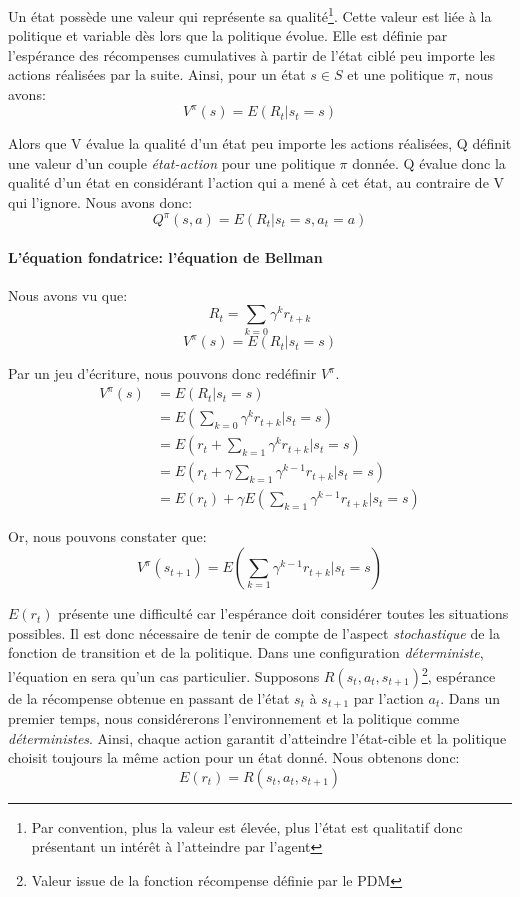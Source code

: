 \noindent Un état possède une valeur qui représente sa qualité\footnote{Par convention, plus la valeur est élevée, plus l'état est qualitatif donc présentant un intérêt à l'atteindre par l'agent}. Cette valeur est liée à la politique et variable dès lors que la politique évolue. Elle est définie par l'espérance des récompenses cumulatives à partir de l'état ciblé peu importe les actions réalisées par la suite. Ainsi, pour un état $s \in S$ et une politique $\pi$, nous avons:
$$V^\pi(s)=E(R_t|s_t=s)$$

\noindent Alors que V évalue la qualité d'un état peu importe les actions réalisées, Q définit une valeur d'un couple \textit{état-action} pour une politique $\pi$ donnée. Q évalue donc la qualité d'un état en considérant l'action qui a mené à cet état, au contraire de V qui l'ignore. Nous avons donc:
$$Q^\pi(s,a)=E(R_t|s_t=s, a_t=a)$$

\paragraph{L'équation fondatrice: l'équation de Bellman}
Nous avons vu que:
$$ R_t=\sum_{k=0}\gamma^k r_{t+k}$$
$$V^\pi(s)=E(R_t|s_t=s)$$

\noindent Par un jeu d'écriture, nous pouvons donc redéfinir $V^\pi$.
\begin{align}
   V^\pi(s) &= E(R_t|s_t=s) \\
   & = E(\sum_{k=0}\gamma^k r_{t+k}|s_t=s)\\
   & = E(r_t + \sum_{k=1}\gamma^k r_{t+k}|s_t=s)\\
   & = E(r_t + \gamma \sum_{k=1}\gamma^{k-1} r_{t+k}|s_t=s)\\
   & = E(r_t) + \gamma E(\sum_{k=1}\gamma^{k-1} r_{t+k}|s_t=s)
\end{align}

\noindent Or, nous pouvons constater que:
$$V^\pi(s_{t+1})=E(\sum_{k=1}\gamma^{k-1} r_{t+k}|s_t=s)$$

\noindent $E(r_t)$ présente une difficulté car l'espérance doit considérer toutes les situations possibles. Il est donc nécessaire de tenir de compte de l'aspect \textit{stochastique} de la fonction de transition et de la politique. Dans une configuration \textit{déterministe}, l'équation en sera qu'un cas particulier. Supposons $R(s_t,a_t,s_{t+1})$\footnote{Valeur issue de la fonction récompense définie par le PDM}, espérance de la récompense obtenue en passant de l'état $s_t$ à $s_{t+1}$ par l'action $a_t$. Dans un premier temps, nous considérerons l'environnement et la politique comme \textit{déterministes}. Ainsi, chaque action garantit d'atteindre l'état-cible et la politique choisit toujours la même action pour un état donné. Nous obtenons donc:
$$E(r_t)=R(s_t,a_t,s_{t+1})$$

